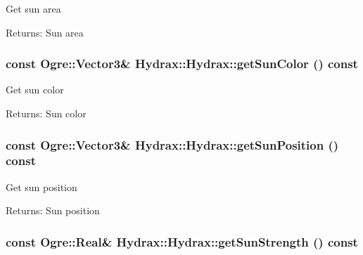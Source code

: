 Get sun area \begin{Desc}
\item[Returns:]Sun area \end{Desc}
\hypertarget{class_hydrax_1_1_hydrax_7b40b2febde3f65bf5b2532a9cb752ff}{
\subsubsection[{getSunColor}]{\setlength{\rightskip}{0pt plus 5cm}const Ogre::Vector3\& Hydrax::Hydrax::getSunColor () const}}
\label{class_hydrax_1_1_hydrax_7b40b2febde3f65bf5b2532a9cb752ff}


Get sun color \begin{Desc}
\item[Returns:]Sun color \end{Desc}
\hypertarget{class_hydrax_1_1_hydrax_6391180e70faf46ee681466620a85f4d}{
\subsubsection[{getSunPosition}]{\setlength{\rightskip}{0pt plus 5cm}const Ogre::Vector3\& Hydrax::Hydrax::getSunPosition () const}}
\label{class_hydrax_1_1_hydrax_6391180e70faf46ee681466620a85f4d}


Get sun position \begin{Desc}
\item[Returns:]Sun position \end{Desc}
\hypertarget{class_hydrax_1_1_hydrax_acad398f575cb867b93eee4c7397c14b}{
\subsubsection[{getSunStrength}]{\setlength{\rightskip}{0pt plus 5cm}const Ogre::Real\& Hydrax::Hydrax::getSunStrength () const}}
\label{class_hydrax_1_1_hydrax_acad398f575cb867b93eee4c7397c14b}



